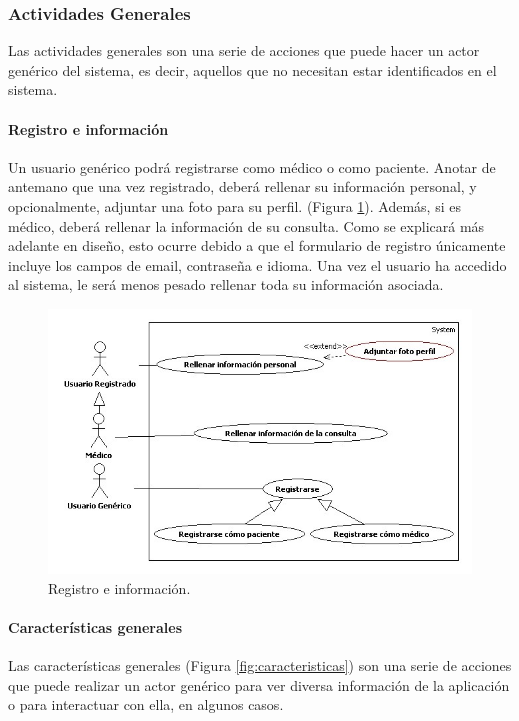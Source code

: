 			
	
		\subsubsection{Actividades Generales} %
		\label{sec:actividades_generales}
		
			Las actividades generales son una serie de acciones que puede hacer un actor genérico del sistema, es decir, aquellos que no necesitan estar identificados en el sistema.
			\paragraph{Registro e información} %
			\label{par:registro_e_informacion}
				Un usuario genérico podrá registrarse como médico o como paciente. Anotar de antemano que una vez registrado, deberá rellenar su información personal, y opcionalmente, adjuntar una foto para su perfil. (Figura \ref{fig:reg_inf}). Además, si es médico, deberá rellenar la información de su consulta. Como se explicará más adelante en diseño, esto ocurre debido a que el formulario de registro únicamente incluye los campos de email, contraseña e idioma. Una vez el usuario ha accedido al sistema, le será menos pesado rellenar toda su información asociada.
				\begin{figure}[H]
				  \centering
				    \includegraphics[width=14cm]{img/jpg/casos_uso/Registro_e_informacion.jpg}
				  \caption{Registro e información.}
				  \label{fig:reg_inf}
				\end{figure}
			
			\paragraph{Características generales} %
			\label{par:caracteristicas_generales}
				Las características generales (Figura \ref{fig:caracteristicas}) son una serie de acciones que puede realizar un actor genérico para ver diversa información de la aplicación o para interactuar con ella, en algunos casos.
							
